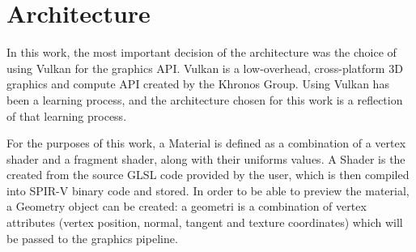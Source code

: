 \section{Architecture}
In this work, the most important decision of the architecture was the choice of using Vulkan for the graphics API. Vulkan is a low-overhead, cross-platform 3D graphics and compute API created by the Khronos Group. Using Vulkan has been a learning process, and the architecture chosen for this work is a reflection of that learning process.

For the purposes of this work, a Material is defined as a combination of a vertex shader and a fragment shader, along with their uniforms values. A Shader is the created from the source GLSL code provided by the user, which is then compiled into SPIR-V binary code and stored. In order to be able to preview the material, a Geometry object can be created: a geometri is a combination of vertex attributes (vertex position, normal, tangent and texture coordinates) which will be passed to the graphics pipeline.










